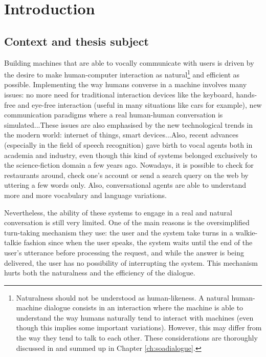 \chapter*{Introduction}

\section*{Context and thesis subject}

				Building machines that are able to vocally communicate with users is driven by the desire to make human-computer interaction as natural\footnote{Naturalness should not be understood as human-likeness. A natural human-machine dialogue consists in an interaction where the machine is able to understand the way humans naturally tend to interact with machines (even though this implies some important variations). However, this may differ from the way they tend to talk to each other. These considerations are thoroughly discussed in \cite{Edlund2008} and summed up in Chapter \ref{ch:soadialogue}.} and efficient as possible. Implementing the way humans converse in a machine involves many issues: no more need for traditional interaction devices like the keyboard, hands-free and eye-free interaction (useful in many situations like cars for example), new communication paradigms where a real human-human conversation is simulated...These issues are also emphasised by the new technological trends in the modern world: internet of things, smart devices...Also, recent advances (especially in the field of speech recognition) gave birth to vocal agents both in academia and industry, even though this kind of systems belonged exclusively to the science-fiction domain a few years ago. Nowadays, it is possible to check for restaurants around, check one's account or send a search query on the web by uttering a few words only. Also, conversational agents are able to understand more and more vocabulary and language variations.
				
				Nevertheless, the ability of these systems to engage in a real and natural conversation is still very limited. One of the main reasons is the oversimplified turn-taking mechanism they use: the user and the system take turns in a walkie-talkie fashion since when the user speaks, the system waits until the end of the user's utterance before processing the request, and while the answer is being delivered, the user has no possibility of interrupting the system. This mechanism hurts both the naturalness and the efficiency of the dialogue.
				
